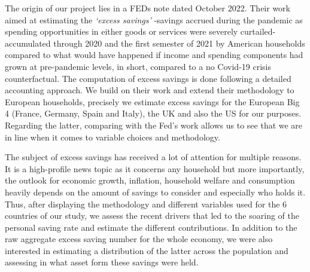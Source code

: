 \quad The origin of our project lies in a FEDs note dated October 2022\cite{savingsfed}. 
Their work aimed at estimating the \textit{‘excess savings’} -savings accrued during the pandemic as spending opportunities in either goods or services were severely curtailed- accumulated through 2020 and the first semester of 2021 by American households compared to what would have happened if income and spending components had grown at pre-pandemic levels, in short, compared to a no Covid-19 crisis counterfactual. 
The computation of excess savings is done following a detailed accounting approach. 
We build on their work and extend their methodology to European households, precisely we estimate excess savings for the European Big 4 (France, Germany, Spain and Italy), the UK and also the US for our purposes. 
Regarding the latter, comparing with the Fed’s work allows us to see that we are in line when it comes to variable choices and methodology.\par
The subject of excess savings has received a lot of attention for multiple reasons. It is a high-profile news topic as it concerns any household but more importantly, the outlook for economic growth, inflation, household welfare and consumption heavily depends on the amount of savings to consider and especially who holds it. Thus, after displaying the methodology and different variables used for the 6 countries of our study, we assess the recent drivers that led to the soaring of the personal saving rate and estimate the different contributions. In addition to the raw aggregate excess saving number for the whole economy, we were also interested in estimating a distribution of the latter across the population and assessing in what asset form these savings were held.

